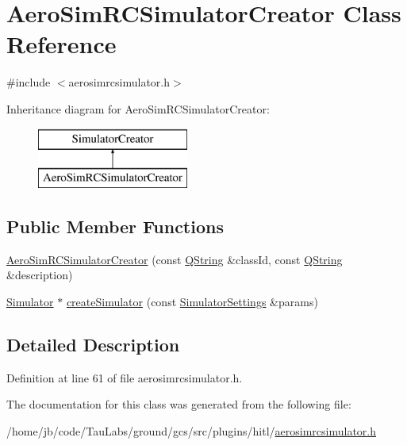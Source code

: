 \hypertarget{class_aero_sim_r_c_simulator_creator}{\section{\-Aero\-Sim\-R\-C\-Simulator\-Creator \-Class \-Reference}
\label{class_aero_sim_r_c_simulator_creator}
}


{\ttfamily \#include $<$aerosimrcsimulator.\-h$>$}

\-Inheritance diagram for \-Aero\-Sim\-R\-C\-Simulator\-Creator\-:\begin{figure}[H]
\begin{center}
\leavevmode
\includegraphics[height=2.000000cm]{class_aero_sim_r_c_simulator_creator}
\end{center}
\end{figure}
\subsection*{\-Public \-Member \-Functions}
\begin{DoxyCompactItemize}
\item 
\hyperlink{group___h_i_t_l_plugin_ga7e85a0e376c9dcd7dae84a4f2cf14d10}{\-Aero\-Sim\-R\-C\-Simulator\-Creator} (const \hyperlink{group___u_a_v_objects_plugin_gab9d252f49c333c94a72f97ce3105a32d}{\-Q\-String} \&class\-Id, const \hyperlink{group___u_a_v_objects_plugin_gab9d252f49c333c94a72f97ce3105a32d}{\-Q\-String} \&description)
\item 
\hyperlink{class_simulator}{\-Simulator} $\ast$ \hyperlink{group___h_i_t_l_plugin_ga25c808a48fec179504d84ef28fe8e762}{create\-Simulator} (const \hyperlink{group___h_i_t_l_plugin_ga052199f1328d3002bce3e45345aa7f4e}{\-Simulator\-Settings} \&params)
\end{DoxyCompactItemize}


\subsection{\-Detailed \-Description}


\-Definition at line 61 of file aerosimrcsimulator.\-h.



\-The documentation for this class was generated from the following file\-:\begin{DoxyCompactItemize}
\item 
/home/jb/code/\-Tau\-Labs/ground/gcs/src/plugins/hitl/\hyperlink{aerosimrcsimulator_8h}{aerosimrcsimulator.\-h}\end{DoxyCompactItemize}
